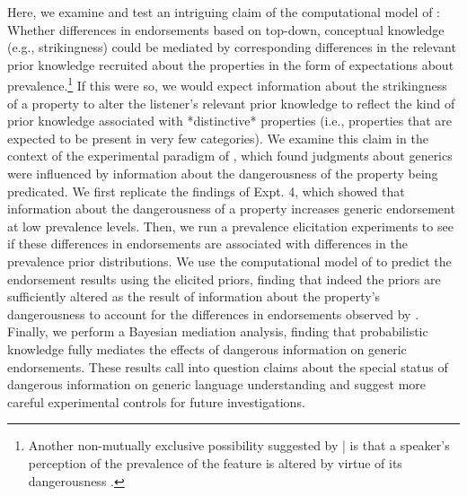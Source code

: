 \documentclass[floatsintext,doc]{apa6}
\begin{document}
Here, we examine and test an intriguing claim of the computational model of : Whether differences in endorsements based on top-down, conceptual knowledge (e.g., strikingness) could be mediated by corresponding differences in the relevant prior knowledge recruited about the properties in the form of expectations about prevalence.\footnote{
  Another non-mutually exclusive possibility suggested by | is that a speaker's perception of the prevalence of the feature is altered by virtue of its dangerousness \cite{Rothbart1978}.
}
If this were so, we would expect information about the strikingness of a property to alter the listener's relevant prior knowledge to reflect the kind of prior knowledge associated with *distinctive* properties (i.e., properties that are expected to be present in very few categories).
We examine this claim in the context of the experimental paradigm of , which found judgments about generics were influenced by information about the dangerousness of the property being predicated. 
We first replicate the findings of  Expt. 4, which showed that information about the dangerousness of a property increases generic endorsement at low prevalence levels.
Then, we run a prevalence elicitation experiments to see if these differences in endorsements are associated with differences in the prevalence prior distributions.
We use the computational model of  to predict the endorsement results using the elicited priors, finding that indeed the priors are sufficiently altered as the result of information about the property's dangerousness to account for the differences in endorsements observed by .
Finally, we perform a Bayesian mediation analysis, finding that probabilistic knowledge fully mediates the effects of dangerous information on generic endorsements.
These results call into question claims about the special status of dangerous information on generic language understanding and suggest more careful experimental controls for future investigations.



\setlength{\bibleftmargin}{.125in}
\setlength{\bibindent}{-\bibleftmargin}


\end{document}
